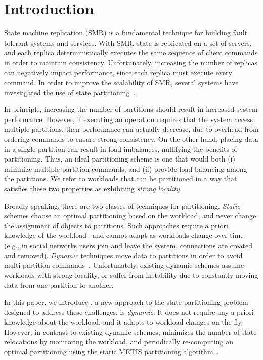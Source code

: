 \section{Introduction}

State machine replication (SMR) is a fundamental technique for
building fault tolerant systems and services. With SMR, state is
replicated on a set of servers, and each replica deterministically
executes the same sequence of client commands in order to maintain
consistency. Unfortunately, increasing the number of replicas can
negatively impact performance, since each replica must execute every
command.  In order to improve the scalability of SMR, several systems
have investigated the use of state partitioning~\cite{facebookTAO,
  sciascia2012sdur, Aguilera:2007}.

In principle, increasing the number of partitions should result in
increased system performance. However, if executing an operation
requires that the system access multiple partitions, then performance
can actually decrease, due to overhead from ordering commands to
ensure strong consistency. On the other hand, placing data in a single
partition can result in load imbalances, nullifying the benefits of
partitioning.  Thus, an ideal partitioning scheme is one that would
both (i) minimize multiple partition commands, and (ii) provide load
balancing among the partitions. We refer to workloads that can be
partitioned in a way that satisfies these two properties as exhibiting
\emph{strong locality}.

Broadly speaking, there are two classes of techniques for
partitioning. \emph{Static} schemes choose an optimal partitioning
based on the workload, and never change the assignment of objects to
partitions. Such approaches require a priori knowledge of the
workload~\cite{curino2010sch} and cannot adapt as workloads change
over time (e.g., in social networks users join and leave the system,
connections are created and removed).  \emph{Dynamic} techniques move
data to partitions in order to avoid multi-partition
commands~\cite{long16}. Unfortunately, existing dynamic schemes assume
workloads with strong locality, or suffer from instability due to
constantly moving data from one partition to another.


In this paper, we introduce \dynastar, a new approach to the state
partitioning problem designed to address these challenges.  \dynastar
is \emph{dynamic}. It does not require any a priori knowledge about
the workload, and it adapts to workload changes on-the-fly. However,
in contrast to existing dynamic schemes, \dynastar minimizes the
number of state relocations by monitoring the workload, and
periodically re-computing an optimal partitioning using the static
METIS partitioning algorithm~\cite{Abou-Rjeili:2006}.


